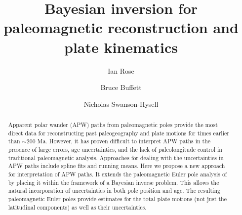 \documentclass[preprint,12pt,authoryear]{elsarticle}
\begin{document}
\begin{frontmatter}



\title{Bayesian inversion for paleomagnetic reconstruction and plate kinematics}


\author{Ian Rose}
\author{Bruce Buffett}
\author{Nicholas Swanson-Hysell}


\address{}

\begin{abstract}
Apparent polar wander (APW) paths from paleomagnetic poles provide the most direct data
for reconstructing past paleogeography and plate motions for times earlier than $\sim$200 Ma. 
However, it has proven difficult to interpret APW paths in the presence of large errors,
age uncertainties, and the lack of paleolongitude control in traditional paleomagnetic analysis.
Approaches for dealing with the uncertainties in APW paths include spline fits and running means.
Here we propose a new approach for interpretation of APW paths.
It extends the paleomagnetic Euler pole analysis of \citet{gordon1984paleomagnetic}
by placing it within the framework of a Bayesian inverse problem.
This allows the natural incorporation of uncertainties in both pole position and age.
The resulting paleomagnetic Euler poles provide estimates for the total
plate motions (not just the latitudinal components) as well as their uncertainties.


\end{abstract}
\end{frontmatter}
\end{document}
